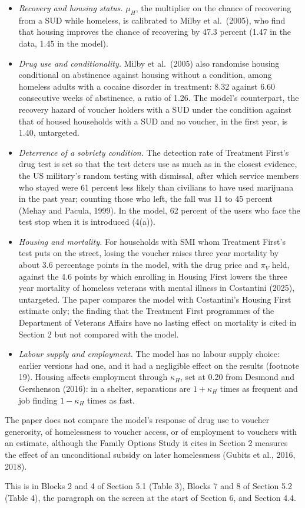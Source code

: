 \documentclass[11pt]{article}
\begin{document}
\begin{response}
\begin{itemize}
\item \emph{Recovery and housing status.} $\mu_H$, the multiplier on the chance
of recovering from a SUD while homeless, is calibrated to Milby et al.\ (2005),
who find that housing improves the chance of recovering by 47.3 percent (1.47 in
the data, 1.45 in the model).
\item \emph{Drug use and conditionality.} Milby et al.\ (2005) also randomise
housing conditional on abstinence against housing without a condition, among
homeless adults with a cocaine disorder in treatment: 8.32 against 6.60
consecutive weeks of abstinence, a ratio of 1.26. The model's counterpart, the
recovery hazard of voucher holders with a SUD under the condition against that of
housed households with a SUD and no voucher, in the first year, is 1.40,
untargeted.
\item \emph{Deterrence of a sobriety condition.} The detection rate of Treatment
First's drug test is set so that the test deters use as much as in the closest
evidence, the US military's random testing with dismissal, after which service
members who stayed were 61 percent less likely than civilians to have used
marijuana in the past year; counting those who left, the fall was 11 to 45
percent (Mehay and Pacula, 1999). In the model, 62 percent of the users who face
the test stop when it is introduced (4(a)).
\item \emph{Housing and mortality.} For households with SMI whom Treatment First's
test puts on the street, losing the voucher raises three year mortality by about
3.6 percentage points in the model, with the drug price and $\pi_V$ held, against
the 4.6 points by which enrolling in Housing First lowers the three year mortality
of homeless veterans with mental illness in Costantini (2025), untargeted. The
paper compares the model with Costantini's Housing First estimate only; the finding that
the Treatment First programmes of the Department of Veterans Affairs have no
lasting effect on mortality is cited in Section 2 but not compared with the
model.
\item \emph{Labour supply and employment.} The model has no labour supply choice:
earlier versions had one, and it had a negligible effect on the results
(footnote 19). Housing affects employment through $\kappa_H$, set at 0.20 from
Desmond and Gershenson (2016): in a shelter, separations are $1+\kappa_H$ times
as frequent and job finding $1-\kappa_H$ times as fast.
\end{itemize}

\open The paper does not compare the model's response of drug use to voucher
generosity, of homelessness to voucher access, or of employment to vouchers with
an estimate, although the Family Options Study it cites in Section 2 measures the
effect of an unconditional subsidy on later homelessness (Gubits et al., 2016,
2018).

This is in Blocks 2 and 4 of Section 5.1 (Table 3), Blocks 7 and 8 of Section 5.2
(Table 4), the paragraph on the screen at the start of Section 6, and Section 4.4.
\end{response}
\end{document}
